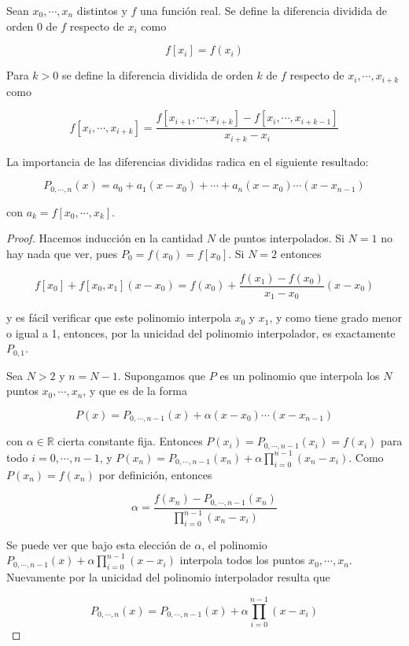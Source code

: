 \begin{defi}
Sean $x_0, \cdots, x_n$ distintos y $f$ una función real. Se define la diferencia dividida de orden 0 de $f$ respecto de $x_i$ como

\[f[x_i] = f(x_i)\]

Para $k > 0$ se define la diferencia dividida de orden $k$ de $f$ respecto de $x_i, \cdots, x_{i + k}$ como

\[f[x_i, \cdots, x_{i + k}] = \frac{f[x_{i + 1}, \cdots, x_{i + k}] - f[x_i, \cdots, x_{i + k - 1}]}{x_{i + k} - x_i}\]
\end{defi}

La importancia de las diferencias divididas radica en el siguiente resultado:

\begin{propo}
\[P_{0, \cdots, n}(x) = a_0 + a_1 (x - x_0) + \cdots + a_n (x - x_0)\cdots (x - x_{n - 1})\]

con $a_k = f[x_0, \cdots, x_k]$.
\begin{proof}
Hacemos inducción en la cantidad $N$ de puntos interpolados. Si $N = 1$ no hay nada que ver, pues $P_0 = f(x_0) = f[x_0]$. Si $N = 2$ entonces

\[f[x_0] + f[x_0, x_1] (x - x_0) = f(x_0) + \frac{f(x_1) - f(x_0)}{x_1 - x_0} (x - x_0)\]

y es fácil verificar que este polinomio interpola $x_0$ y $x_1$, y como tiene grado menor o igual a 1, entonces, por la unicidad del polinomio interpolador, es exactamente $P_{0, 1}$. 

Sea $N > 2$ y $n = N - 1$. Supongamos que $P$ es un polinomio que interpola los $N$ puntos $x_0, \cdots, x_n$, y que es de la forma

\[P(x) = P_{0, \cdots, n - 1}(x) + \alpha (x - x_0) \cdots (x - x_{n - 1})\]

con $\alpha \in \mathbb{R}$ cierta constante fija. Entonces $P(x_i) = P_{0, \cdots, n - 1}(x_i) = f(x_i)$ para todo $i = 0, \cdots, n - 1$, y $P(x_n) = P_{0, \cdots, n - 1}(x_n) + \alpha \prod_{i = 0}^{n - 1}(x_n - x_i)$. Como $P(x_n) = f(x_n)$ por definición, entonces 

\[\alpha = \frac{f(x_n) - P_{0, \cdots, n - 1}(x_n)}{\prod_{i = 0}^{n - 1}(x_n - x_i)}\]

Se puede ver que bajo esta elección de $\alpha$, el polinomio $P_{0, \cdots, n - 1}(x) + \alpha \prod_{i = 0}^{n - 1}(x - x_i)$ interpola todos los puntos $x_0, \cdots, x_n$. Nuevamente por la unicidad del polinomio interpolador resulta que 

\[P_{0, \cdots, n}(x) = P_{0, \cdots, n - 1}(x) + \alpha \prod_{i = 0}^{n - 1}(x - x_i)\]


\end{proof}
\end{propo}

